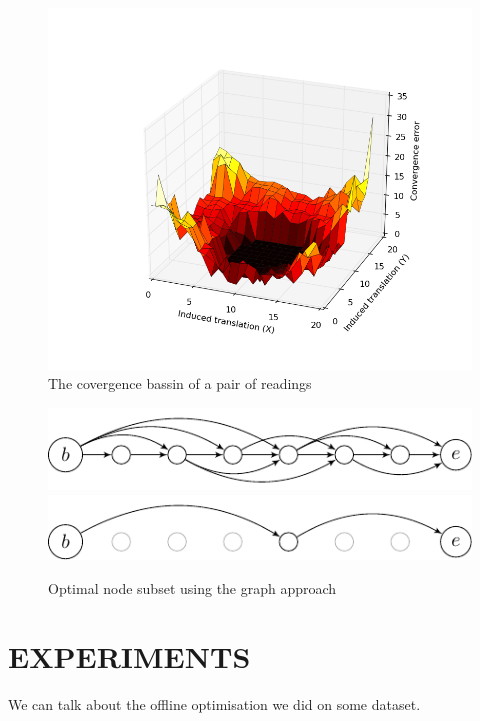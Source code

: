 \documentclass[letterpaper,10 pt,conference]{ieeeconf}
\begin{document}
\begin{figure}
  \centering
  \includegraphics[scale=0.4]{convergence_bassin}
  \caption{The covergence bassin of a pair of readings}
\end{figure}


\begin{figure}[thpb]
  \centering
  \includegraphics[scale=1.0]{unoptimized-graph}
  \includegraphics[scale=1.0]{optimized-graph}
  \caption{Optimal node subset using the graph approach}
\end{figure}


\section{EXPERIMENTS}
We can talk about the offline optimisation we did on some dataset.
\end{document}
